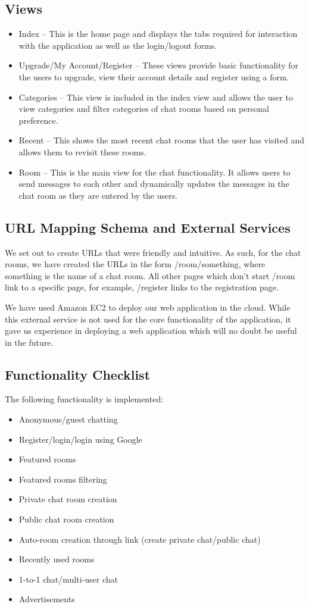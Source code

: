 \documentclass{sig-alt-release2}
\begin{document}
\subsection{Views}
\begin{itemize}
\item Index -- This is the home page and displays the tabs required for interaction with the application as well as the login/logout forms.
\item Upgrade/My Account/Register -- These views provide basic functionality for the users to upgrade, view their account details and register using a form.
\item Categories -- This view is included in the index view and allows the user to view categories and filter categories of chat rooms based on personal preference.
\item Recent -- This shows the most recent chat rooms that the user has visited and allows them to revisit these rooms.
\item Room -- This is the main view for the chat functionality. It allows users to send messages to each other and dynamically updates the messages in the chat room as they are entered by the users.
\end{itemize}

\subsection{URL Mapping Schema and External Services}
We set out to create URLs that were friendly and intuitive. As such, for the chat rooms, we have created the URLs in the form /room/something, where something is the name of a chat room. All other pages which don't start /room link to a specific page, for example, /register links to the registration page.

We have used Amazon EC2 to deploy our web application in the cloud. While this external service is not used for the core functionality of the application, it gave us experience in deploying a web application which will no doubt be useful in the future.

\subsection{Functionality Checklist}
The following functionality is implemented:
\begin{itemize}
\item Anonymous/guest chatting
\item Register/login/login using Google
\item Featured rooms
\item Featured rooms filtering
\item Private chat room creation
\item Public chat room creation
\item Auto-room creation through link (create private chat/public chat)
\item Recently used rooms
\item 1-to-1 chat/multi-user chat
\item Advertisements
\end{itemize}
\end{document}
